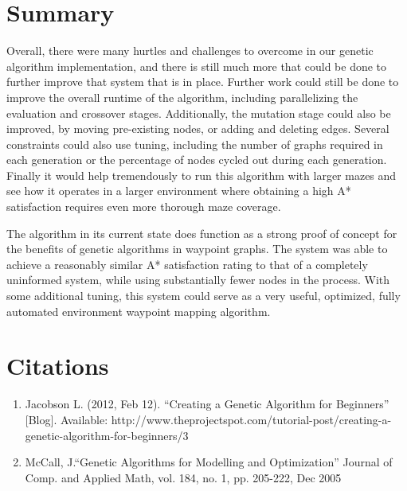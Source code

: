 \section{Summary}
	Overall, there were many hurtles and challenges to overcome in our genetic algorithm implementation, and there is still much more that could be done to further improve that system that is in place. Further work could still be done to improve the overall runtime of the algorithm, including parallelizing the evaluation and crossover stages. Additionally, the mutation stage could also be improved, by moving pre-existing nodes, or adding and deleting edges. Several constraints could also use tuning, including the number of graphs required in each generation or the percentage of nodes cycled out during each generation. Finally it would help tremendously to run this algorithm with larger mazes and see how it operates in a larger environment where obtaining a high A* satisfaction requires even more thorough maze coverage.
	
	The algorithm in its current state does function as a strong proof of concept for the benefits of genetic algorithms in waypoint graphs. The system was able to achieve a reasonably similar A* satisfaction rating to that of a completely uninformed system, while using substantially fewer nodes in the process. With some additional tuning, this system could serve as a very useful, optimized, fully automated environment waypoint mapping algorithm.


\section{Citations}

\begin{enumerate}
	\item Jacobson L. (2012, Feb 12). “Creating a Genetic Algorithm for Beginners” [Blog]. Available: http://www.theprojectspot.com/tutorial-post/creating-a-genetic-algorithm-for-beginners/3 
	\item McCall, J.“Genetic Algorithms for Modelling and Optimization” Journal of Comp. and Applied Math, vol. 184, no. 1, pp. 205-222, Dec 2005
\end{enumerate}